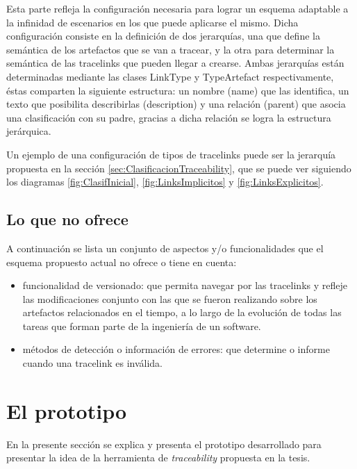 \documentclass[a4paper,12pt,oneside,spanish]{book}
\begin{document}
Esta parte refleja la configuración necesaria para lograr un esquema adaptable a la infinidad de escenarios en los que puede aplicarse el mismo. Dicha configuración consiste en la definición de dos jerarquías, una que define la semántica de los artefactos que se van a tracear, y la otra para determinar la semántica de las tracelinks que pueden llegar a crearse. Ambas jerarquías están determinadas mediante las clases LinkType y TypeArtefact respectivamente, éstas comparten la siguiente estructura: un nombre (name) que las identifica, un texto que posibilita describirlas (description) y una relación (parent) que asocia una clasificación con su padre, gracias a dicha relación se logra la estructura jerárquica.

Un ejemplo de una configuración de tipos de tracelinks puede ser la jerarquía propuesta en la sección \ref{sec:ClasificacionTraceability}, que se puede ver siguiendo los diagramas \ref{fig:ClasifInicial}, \ref{fig:LinksImplicitos} y \ref{fig:LinksExplicitos}.


\subsection{Lo que no ofrece}

A continuación se lista un conjunto de aspectos y/o funcionalidades que el esquema propuesto actual no ofrece o tiene en cuenta:

\begin{itemize}

\item funcionalidad de versionado: que permita navegar por las tracelinks y refleje las modificaciones conjunto con las que se fueron realizando sobre los artefactos relacionados en el tiempo, a lo largo de la evolución de todas las tareas que forman parte de la ingeniería de un software.

\item métodos de detección o información de errores: que determine o informe cuando una tracelink es inválida.

\end{itemize}


\section{El prototipo}

En la presente sección se explica y presenta el prototipo desarrollado  para presentar la idea de la herramienta de \textit{traceability} propuesta en la tesis.
\end{document}
